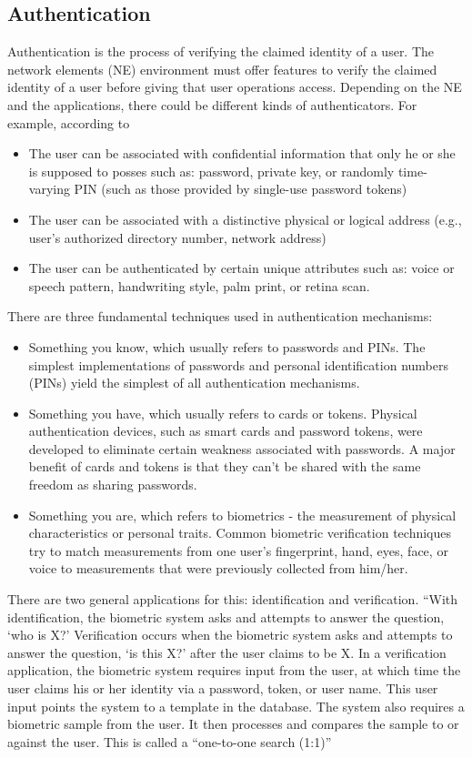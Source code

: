 \documentclass[12pt]{article}			%
\begin{document}
\subsection{ Authentication }
Authentication is the process of verifying the claimed identity of a user. The network elements (NE) environment must offer features to verify the claimed identity of a user before giving that user operations access. Depending on the NE and the applications, there could be different kinds of authenticators. For example, according to \cite{war02}
\begin{itemize}
\item The user can be associated with confidential information that only he or she is supposed to posses such as: password, private key, or randomly time-varying PIN (such as those provided by single-use password tokens) 
\item The user can be associated with a distinctive physical or logical address (e.g., user’s authorized directory number, network address)
\item The user can be authenticated by certain unique attributes such as: voice or speech pattern, handwriting style, palm print, or retina scan.
\end{itemize}
There are three fundamental techniques used in authentication mechanisms\cite{john03}:
\begin{itemize}
\item Something you know, which usually refers to passwords and PINs. The simplest implementations of passwords and personal identification numbers (PINs) yield the
simplest of all authentication mechanisms.
\item Something you have, which usually refers to cards or tokens. Physical authentication devices, such as smart cards and password tokens, were developed to eliminate certain weakness associated with passwords. A major benefit of cards and tokens is that they can’t be shared with the same freedom as sharing passwords.
\item Something you are, which refers to biometrics - the measurement of physical characteristics or personal traits. Common biometric verification techniques try to match measurements from one user’s fingerprint, hand, eyes, face, or voice to measurements that were previously collected from him/her.
\end{itemize}
There are two general applications for this: identification and verification. “With identification, the biometric system asks and attempts to answer the question, ‘who is X?’ Verification occurs when the biometric system asks and attempts to answer the question, ‘is this X?’ after the user claims to be X. In a verification application, the biometric system requires input from the user, at which time the user claims his or her identity via a password, token, or user name. This user input points the system to a template in the database. The system also requires a biometric sample from the user. It then processes and compares the sample to or against the user. This is called a “one-to-one search (1:1)”
\end{document}

